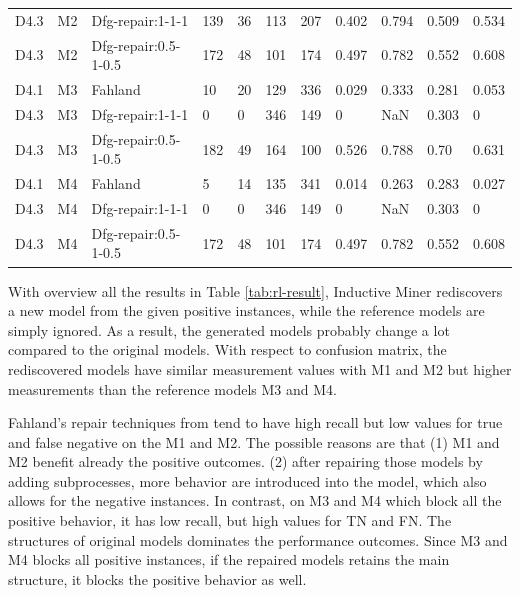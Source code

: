 \begin{table}[ht]
{\begin{tabular}{lll|llllllll|}
			D4.3      & M2              & Dfg-repair:1-1-1     &  139   & 36   & 113    &   207  &   0.402     &   0.794        &   0.509       &   0.534              \\
			D4.3      & M2              & Dfg-repair:0.5-1-0.5     &  172   & 48   & 101    &   174  &   0.497     &   0.782        &   0.552       &   0.608              \\
			\hline
			D4.1      & M3              & Fahland   & 10    &  20  & 129    &  336   & 0.029       &    0.333       &  0.281        &  0.053                    \\
			D4.3      & M3              & Dfg-repair:1-1-1       &  0   &  0  & 346    &  149   &  0      &   NaN        &   0.303       &  0       \\ 
			D4.3      & M3              & Dfg-repair:0.5-1-0.5       &  182   &  49  & 164    &  100   &  0.526      &   0.788        &   0.70       &  0.631      \\ 
			
			\hline
			D4.1      & M4              & Fahland   & 5    &  14  & 135    &  341   & 0.014      &    0.263      &  0.283        &  0.027                 \\
			
			D4.3      & M4              & Dfg-repair:1-1-1       &   0  & 0   &  346   & 149    &   0     &    NaN       &     0.303     &  0      \\  
			D4.3      & M4              & Dfg-repair:0.5-1-0.5       &   172  & 48   &  101   & 174    &   0.497     &    0.782       &     0.552     &  0.608      \\      
			\hline              
	\end{tabular}}
\end{table}

With overview all the results in Table \ref{tab:rl-result}, Inductive Miner rediscovers a new model from the given positive instances, while the reference models are simply ignored. As a result, the generated models probably change a lot compared to the original models. With respect to confusion matrix, the rediscovered models have similar measurement values with M1 and M2 but higher measurements than the reference models M3 and M4.


Fahland's repair techniques from \cite{fahland2015model} tend to have high recall but low values for true and false negative on the M1 and M2. The possible reasons are that (1) M1 and M2 benefit already the positive outcomes.  (2) after repairing those models  by adding subprocesses, more behavior are introduced into the model, which also allows for the negative instances.   In contrast, on M3 and M4 which block all the positive behavior, it has low recall, but high values for TN and FN. The structures of original models dominates the performance outcomes. Since M3 and M4 blocks all positive instances, if the repaired models retains the main structure, it  blocks the positive behavior as well. 


